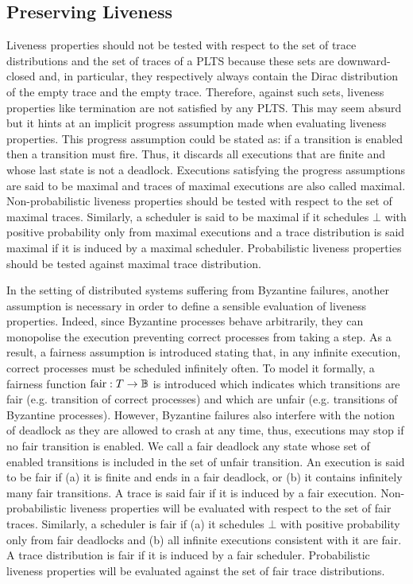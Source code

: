 \subsection{Preserving Liveness}

Liveness properties should not be tested with respect to the set of trace distributions and the set 
of traces of a PLTS because these sets are downward-closed and, in particular, they respectively 
always contain the Dirac distribution of the empty trace and the empty trace. Therefore, against 
such sets, liveness properties like termination are not satisfied by any PLTS. This may seem absurd
but it hints at an implicit progress assumption made when evaluating liveness properties. This
progress assumption could be stated as: if a transition is enabled then a transition must fire.
Thus, it discards all executions that are finite and whose last state is not a deadlock. Executions 
satisfying the progress assumptions are said to be maximal and traces of maximal executions are
also called maximal. Non-probabilistic liveness properties should be tested with respect to the set of
maximal traces. Similarly, a scheduler is said to be maximal if it schedules $\bot$ with positive 
probability only from maximal executions and a trace distribution is said maximal if it is induced
by a maximal scheduler. Probabilistic liveness properties should be tested against maximal trace 
distribution.

In the setting of distributed systems suffering from Byzantine failures, another assumption is
necessary in order to define a sensible evaluation of liveness properties. Indeed, since Byzantine
processes behave arbitrarily, they can monopolise the execution preventing correct processes from
taking a step. As a result, a fairness assumption is introduced stating that, in any infinite 
execution, correct processes must be scheduled infinitely often. To model it formally, a fairness 
function $\text{fair} : T \rightarrow \mathbb{B}$ is introduced which indicates which transitions are 
fair (e.g. transition of correct processes) and which are unfair (e.g. transitions of Byzantine 
processes). However, Byzantine failures also interfere with the notion of deadlock as they are 
allowed to crash at any time, thus, executions may stop if no fair transition is enabled. We call a
fair deadlock any state whose set of enabled transitions is included in the set of unfair 
transition. An execution is said to be fair if (a) it is finite and ends in a fair deadlock, or (b)
it contains infinitely many fair transitions. A trace is said fair if it is induced by a fair 
execution. Non-probabilistic liveness properties will be evaluated with respect to the set of fair 
traces. Similarly, a scheduler is fair if (a) it schedules $\bot$ with positive probability only 
from fair deadlocks and (b) all infinite executions consistent with it are fair. A trace 
distribution is fair if it is induced by a fair scheduler. Probabilistic liveness properties will 
be evaluated against the set of fair trace distributions.


